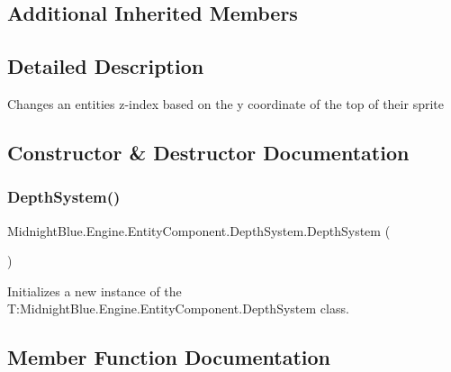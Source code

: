 \subsection*{Additional Inherited Members}


\subsection{Detailed Description}
Changes an entities z-\/index based on the y coordinate of the top of their sprite 



\subsection{Constructor \& Destructor Documentation}
\hypertarget{class_midnight_blue_1_1_engine_1_1_entity_component_1_1_depth_system_a6cab13c32cca4dcaa8a73fa18c4d84f1}{}\label{class_midnight_blue_1_1_engine_1_1_entity_component_1_1_depth_system_a6cab13c32cca4dcaa8a73fa18c4d84f1} 
\subsubsection{\texorpdfstring{Depth\+System()}{DepthSystem()}}
{\footnotesize\ttfamily Midnight\+Blue.\+Engine.\+Entity\+Component.\+Depth\+System.\+Depth\+System (\begin{DoxyParamCaption}{ }\end{DoxyParamCaption})\hspace{0.3cm}{\ttfamily [inline]}}



Initializes a new instance of the T\+:\+Midnight\+Blue.\+Engine.\+Entity\+Component.\+Depth\+System class. 



\subsection{Member Function Documentation}
\hypertarget{class_midnight_blue_1_1_engine_1_1_entity_component_1_1_depth_system_a5351ff290c847e93fb96dac6cc43719d}{}\label{class_midnight_blue_1_1_engine_1_1_entity_component_1_1_depth_system_a5351ff290c847e93fb96dac6cc43719d} 
